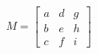 \documentclass[preview]{standalone}
\begin{document}
\begin{align*}
M = \begin{bmatrix} a & d & g \\ b & e & h \\ c & f & i \end{bmatrix}
\end{align*}
\end{document}
